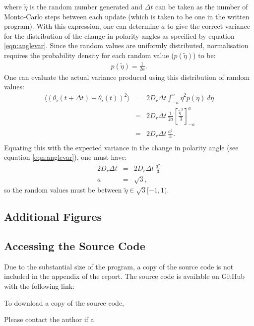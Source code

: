 \documentclass[a4paper,12pt]{article}
\newcommand{\inc}{\Delta}
\begin{document}
where $\tilde\eta$ is the random number generated and $\inc t$ can be taken as the number of Monto-Carlo steps between each update (which is taken to be one in the written program). With this expression, one can determine $a$ to give the correct variance for the distribution of the change in polarity angles as specified by equation \ref{eqn:anglevar}. Since the random values are uniformly distributed, normalisation requires the probability density for each random value ($p(\tilde\eta)$) to be:
\begin{eqnarray}
p(\tilde\eta) = \frac{1}{2a}.
\end{eqnarray}
One can evaluate the actual variance produced using this distribution of random values:
\begin{eqnarray}
\langle\left(\theta_i(t+\inc t) - \theta_i(t)\right)^2\rangle & = & 2D_r\inc t \int_{-a}^{a} \tilde\eta^2 p(\tilde\eta)\, d\tilde\eta\\
& = & 2D_r\inc t\,\frac{1}{2a}\left[\frac{\tilde\eta^3}{3}\right]_{-a}^{a}\\
& = & 2D_r\inc t\,\frac{a^2}{3}.\\
\end{eqnarray}
Equating this with the expected variance in the change in polarity angle (see equation \ref{eqn:anglevar}), one must have:
\begin{eqnarray}
2D_r \inc t & = & 2D_r\inc t\,\frac{a^2}{3}\\
a & = & \sqrt{3},
\end{eqnarray}
so the random values must be between $\tilde\eta \in \sqrt{3}[-1,1)$.

\subsection{Additional Figures}


\subsection{Accessing the Source Code}
Due to the substantial size of the program, a copy of the source code is not included in the appendix of the report. The source code is available on GitHub with the following link: 

To download a copy of the source code, 

Please contact the author if a 
\end{document}
